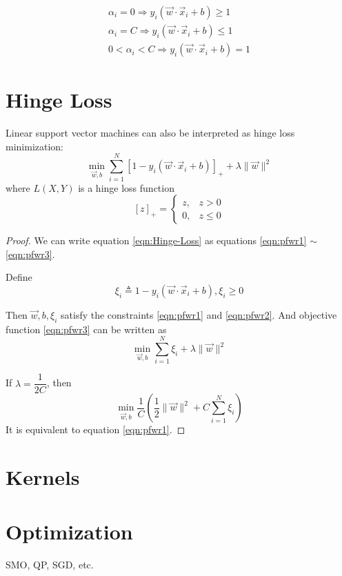 \begin{eqnarray}
\alpha_i=0 \Rightarrow y_i(\vec{w} \cdot \vec{x}_i+b)\geqslant 1 \\
\alpha_i=C \Rightarrow y_i(\vec{w} \cdot \vec{x}_i+b)\leqslant 1 \\
0<\alpha_i<C \Rightarrow y_i(\vec{w} \cdot \vec{x}_i+b)= 1
\end{eqnarray}


\section{Hinge Loss}
Linear support vector machines can also be interpreted as hinge loss minimization:
\begin{equation}\label{eqn:Hinge-Loss}
\min_{\vec{w},b} \sum\limits_{i=1}^N{[1-y_i(\vec{w} \cdot \vec{x}_i + b)]}_+ + \lambda\|\vec{w}\|^2
\end{equation}
where $L(X,Y)$ is a hinge loss function
\begin{equation}
{[z]}_+ = \begin{cases}
z,  & z > 0 \\
0,  & z \leqslant 0
\end{cases}
\end{equation}

\begin{proof}
We can write equation \eqref{eqn:Hinge-Loss} as equations \eqref{eqn:pfwr1} $\sim$ \eqref{eqn:pfwr3}.

Define 
\begin{equation}
\xi_i \triangleq 1-y_i(\vec{w} \cdot \vec{x}_i + b),\xi_i \geqslant 0
\end{equation}

Then $\vec{w},b,\xi_i$ satisfy the constraints \eqref{eqn:pfwr1} and \eqref{eqn:pfwr2}. And objective function \eqref{eqn:pfwr3} can be written as
\begin{equation}
\min_{\vec{w},b} \sum\limits_{i=1}^N{\xi_i}+ \lambda\|\vec{w}\|^2 \nonumber
\end{equation}

If $\lambda=\dfrac{1}{2C}$, then 
\begin{equation}
\min_{\vec{w},b} \dfrac{1}{C}\left(\dfrac{1}{2}\|\vec{w}\|^2+C\sum\limits_{i=1}^N{\xi_i}\right)
\end{equation}
It is equivalent to equation \eqref{eqn:pfwr1}.

\end{proof}

\section{Kernels}


\section{Optimization}
SMO, QP, SGD, etc.
